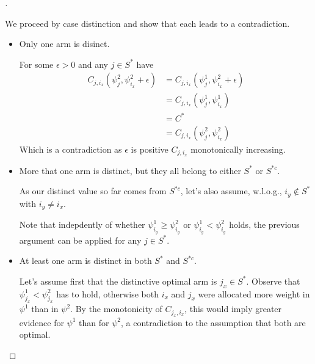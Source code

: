 \begin{proof}[]
\begin{enumerate}[(i)]
    We proceed by case distinction and show that each leads to a contradiction.
    \begin{itemize}
      \item Only one arm is disinct.

      For some $\epsilon > 0$ and any $j \in S^*$ have
      \begin{align}
        C_{j, i_x}(\psi^2_j, \psi^2_{i_x} + \epsilon) &= C_{j, i_x}(\psi^1_j, \psi^2_{i_x} + \epsilon) \\
        &= C_{j, i_x}(\psi^1_j, \psi^1_{i_x}) \\
        &= C^* \\
        &= C_{j, i_x}(\psi^2_j, \psi^2_{i_x})
      \end{align}
      Which is a contradiction as $\epsilon$ is positive $C_{j, i_x}$ monotonically increasing.
      \item More that one arm is distinct, but they all belong to either $S^*$ or $S^{*c}$.

      As our distinct value so far comes from $S^{*c}$, let's also assume, w.l.o.g., $i_y \notin S^*$ with $i_y \neq i_x$.

      Note that indepdently of whether $\psi^1_{i_y} \geq \psi^2_{i_y}$ or $\psi^1_{i_y} < \psi^2_{i_y}$ holds, the previous argument can be applied for any $j \in S^*$.

      \item At least one arm is distinct in both $S^*$ and $S^{*c}$.

      Let's assume first that the distinctive optimal arm is $j_x \in S^*$. Observe that $\psi^1_{j_x} < \psi^2_{j_x}$ has to hold, otherwise both $i_x$ and $j_x$ were allocated more weight in $\psi^1$ than in $\psi^2$. By the monotonicity of $C_{j_x, i_x}$, this would imply greater evidence for $\psi^1$ than for $\psi^2$, a contradiction to the assumption that both are optimal.


\end{itemize}
\end{enumerate}
\end{proof}
